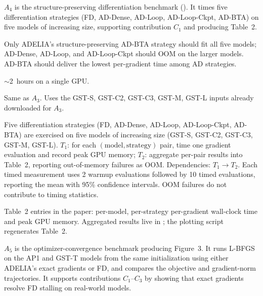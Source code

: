 \documentclass[nonacm,sigconf]{acmart}
\begin{document}
\newartifact

\artrel

$A_4$ is the structure-preserving differentiation benchmark
(). It times
five differentiation strategies (FD, AD-Dense, AD-Loop,
AD-Loop-Ckpt, AD-BTA) on five models of increasing size,
supporting contribution $C_1$ and producing Table~2.

\artexp

Only ADELIA's structure-preserving AD-BTA strategy should fit
all five models; AD-Dense, AD-Loop, and AD-Loop-Ckpt should
OOM on the larger models. AD-BTA should deliver the lowest
per-gradient time among AD strategies.

\arttime

$\sim$2~hours on a single GPU.

\artin


Same as $A_3$. Uses the GST-S, GST-C2, GST-C3, GST-M, GST-L
inputs already downloaded for $A_3$.

\artcomp

Five differentiation strategies (FD, AD-Dense, AD-Loop,
AD-Loop-Ckpt, AD-BTA) are exercised on five models of
increasing size (GST-S, GST-C2, GST-C3, GST-M, GST-L).
$T_1$: for each $(\text{model}, \text{strategy})$ pair, time
one gradient evaluation and record peak GPU memory;
$T_2$: aggregate per-pair results into Table~2, reporting
out-of-memory failures as OOM.
Dependencies: $T_1 \rightarrow T_2$. Each timed measurement
uses 2 warmup evaluations followed by 10 timed evaluations,
reporting the mean with 95\% confidence intervals. OOM
failures do not contribute to timing statistics.

\artout

Table~2 entries in the paper: per-model, per-strategy
per-gradient wall-clock time and peak GPU memory.  Aggregated
results live in ; the plotting script
regenerates Table~2.


\newartifact

\artrel

$A_5$ is the optimizer-convergence benchmark producing
Figure~3. It runs L-BFGS on the AP1 and GST-T models from the
same initialization using either ADELIA's exact gradients or
FD, and compares the objective and gradient-norm trajectories.
It supports contributions $C_1$--$C_3$ by showing that exact
gradients resolve FD stalling on real-world models.
\end{document}
